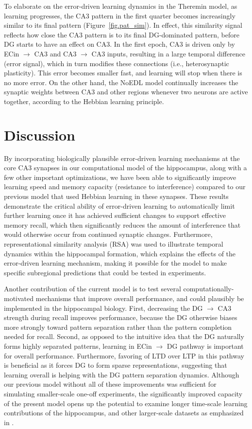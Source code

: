 \documentclass[11pt,twoside]{article}
\newif\myifpdf
\begin{document}
To elaborate on the error-driven learning dynamics in the Theremin model, as learning progresses, the CA3 pattern in the first quarter becomes increasingly similar to its final pattern (Figure~\ref{fig.pat_sim}). In effect, this similarity signal reflects how close the CA3 pattern is to its final DG-dominated pattern, before DG starts to have an effect on CA3. In the first epoch, CA3 is driven only by ECin $\rightarrow$ CA3 and CA3 $\rightarrow$ CA3 inputs, resulting in a large temporal difference (error signal), which in turn modifies these connections (i.e., heterosynaptic plasticity). This error becomes smaller fast, and learning will stop when there is no more error.  On the other hand, the NoEDL model continually increases the synaptic weights between CA3 and other regions whenever two neurons are active together, according to the Hebbian learning principle.

\section{Discussion}

By incorporating biologically plausible error-driven learning mechanisms at the core CA3 synapses in our computational model of the hippocampus, along with a few other important optimizations, we have been able to significantly improve learning speed and memory capacity (resistance to interference) compared to our previous model that used Hebbian learning in these synapses. These results demonstrate the critical ability of error-driven learning to automatically limit further learning once it has achieved sufficient changes to support effective memory recall, which then significantly reduces the amount of interference that would otherwise occur from continued synaptic changes.  Furthermore, representational similarity analysis (RSA) was used to illustrate temporal dynamics within the hippocampal formation, which explains the effects of the error-driven learning mechanism, making it possible for the model to make specific subregional predictions that could be tested in experiments.

Another contribution of the current model is to test several computationally-motivated mechanisms that improve overall performance, and could plausibly be implemented in the hippocampal biology. First, decreasing the DG $\rightarrow$ CA3 strength during recall improves performance, because the DG otherwise biases more strongly toward pattern separation rather than the pattern completion needed for recall. Second, as opposed to the intuitive idea that the DG naturally forms highly separated patterns, learning in ECin $\rightarrow$ DG pathway is important for overall performance.  Furthermore, favoring of LTD over LTP in this pathway is beneficial as it forces DG to form sparse representations, suggesting that learning overall is helping with the DG pattern separation dynamics.  Although our previous model without all of these improvements was sufficient for simulating smaller-scale one-off experiments, the significantly improved capacity of the present model opens up the potential to examine longer time-scale learning contributions of the hippocampus, and other larger-scale datasets as emphasized in \citet{KowadloAhmedRawlinson20}.
\end{document}
